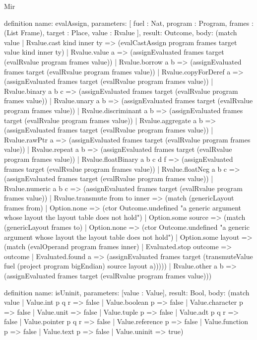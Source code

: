\begin{lexlean}{Mir}
\begin{semanticmodule}
definition{
  name: evalAssign,
  parameters: [
    fuel : Nat,
    program : Program,
    frames : (List Frame),
    target : Place,
    value : Rvalue
  ],
  result: Outcome,
  body: (match value
    | Rvalue.cast kind inner ty => (evalCastAssign program frames target value kind inner ty)
    | Rvalue.value a => (assignEvaluated frames target (evalRvalue program frames value))
    | Rvalue.borrow a b => (assignEvaluated frames target (evalRvalue program frames value))
    | Rvalue.copyForDeref a => (assignEvaluated frames target (evalRvalue program frames value))
    | Rvalue.binary a b c => (assignEvaluated frames target (evalRvalue program frames value))
    | Rvalue.unary a b => (assignEvaluated frames target (evalRvalue program frames value))
    | Rvalue.discriminant a b => (assignEvaluated frames target (evalRvalue program frames value))
    | Rvalue.aggregate a b => (assignEvaluated frames target (evalRvalue program frames value))
    | Rvalue.rawPtr a => (assignEvaluated frames target (evalRvalue program frames value))
    | Rvalue.repeat a b => (assignEvaluated frames target (evalRvalue program frames value))
    | Rvalue.floatBinary a b c d f => (assignEvaluated frames target (evalRvalue program frames value))
    | Rvalue.floatNeg a b c => (assignEvaluated frames target (evalRvalue program frames value))
    | Rvalue.numeric a b c => (assignEvaluated frames target (evalRvalue program frames value))
    | Rvalue.transmute from to inner => (match (genericLayout frames from)
      | Option.none => (ctor Outcome.undefined "a generic argument whose layout the layout table does not hold")
      | Option.some source => (match (genericLayout frames to)
        | Option.none => (ctor Outcome.undefined "a generic argument whose layout the layout table does not hold")
        | Option.some layout => (match (evalOperand program frames inner)
          | Evaluated.stop outcome => outcome
          | Evaluated.found a => (assignEvaluated frames target (transmuteValue fuel (project program bigEndian) source layout a)))))
    | Rvalue.other a b => (assignEvaluated frames target (evalRvalue program frames value)))
}

definition{
  name: isUninit,
  parameters: [value : Value],
  result: Bool,
  body: (match value
    | Value.int p q r => false
    | Value.boolean p => false
    | Value.character p => false
    | Value.unit => false
    | Value.tuple p => false
    | Value.adt p q r => false
    | Value.pointer p q r => false
    | Value.reference p => false
    | Value.function p => false
    | Value.text p => false
    | Value.uninit => true)
}


\end{semanticmodule}
\end{lexlean}
